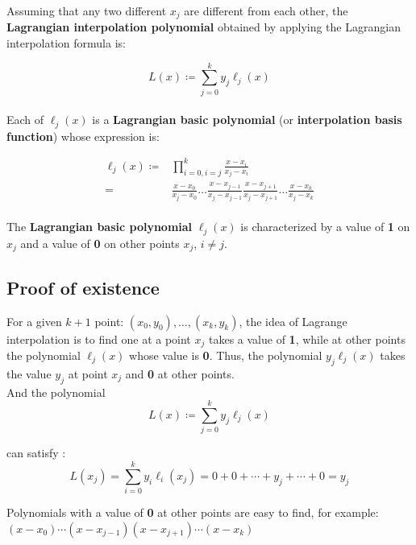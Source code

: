 \documentclass[12pt,a4paper]{article}
\begin{document}
\begin{spacing}{1.5}
\noindent Assuming that any two different ${x_{j}}$ are different from each other, the \textbf{Lagrangian interpolation polynomial} obtained by applying the Lagrangian interpolation formula is:

\begin{equation}
	L(x) \coloneqq \sum_{j=0}^k y_j \ell_j(x)
\end{equation}\\

\noindent Each of $\ell _{j}(x)$ is a \textbf{Lagrangian basic polynomial} (or \textbf{interpolation basis function}) whose expression is:

\begin{equation}
\begin{aligned}
	\ell_j(x) \coloneqq &\prod_{i = 0,i = j}^k 
	\frac{x-x_i}{x_j-x_i} \\
	= &\frac{x-x_0}{x_j-x_0} \ldots
	\frac{x-x_{j-1}}{x_j-x_{j-1}}
	\frac{x-x_{j+1}}{x_j-x_{j+1}} \ldots
	\frac{x-x_k}{x_j-x_k}
\end{aligned}
\end{equation}\\

\noindent The \textbf{Lagrangian basic polynomial} $\ell _{j}(x)$ is characterized by a value of \textbf{1} on ${x_{j}}$ and a value of 
\textbf{0} on other points ${x_{j}}$, ${i\neq j}$.


\newpage
\subsection{Proof of existence}
For a given $k+1$ point: $(x_{0}, y_{0}), \ldots, (x_{k}, y_{k})$, the idea of ​​Lagrange interpolation is to find one at a point $x_{j}$ takes a value of \textbf{1}, while at other points the polynomial $\ell _{j}(x)$ whose value is \textbf{0}. Thus, the polynomial $y_{j}\ell _{j}(x)$ takes the value $y_{j}$ at point $x_{j}$ and \textbf{0} at other points. \\

\noindent And the polynomial 
\begin{equation*}
	L(x) \coloneqq \sum_{j=0}^k y_j \ell_j(x)
\end{equation*}

\noindent can satisfy :
\begin{equation*}
	L(x_{j})=\sum _{{i=0}}^{{k}}y_{i}\ell _{i}(x_{j})=0+0+\cdots +y_{ j}+\cdots +0=y_{j}
\end{equation*}

\noindent Polynomials with a value of \textbf{0} at other points are easy to find, for example:\\
$(x-x_{0})\cdots (x-x_{{j-1}})(x-x_{{j+1}})\cdots (x-x_{{k}})$\\


\end{spacing}
\end{document}
